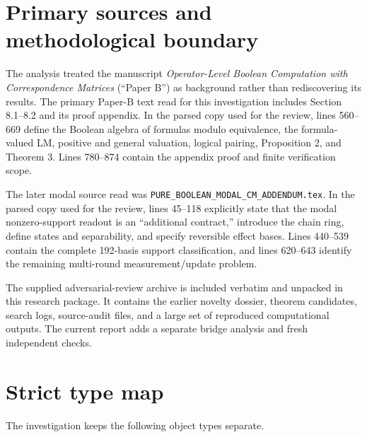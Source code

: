 \documentclass[11pt]{article}
\theoremstyle{definition}
\begin{document}
\section{Primary sources and methodological boundary}

The analysis treated the manuscript \emph{Operator-Level Boolean Computation with Correspondence
Matrices} (``Paper B'') as background rather than rediscovering its results. The primary Paper-B text
read for this investigation includes Section 8.1--8.2 and its proof appendix. In the parsed copy used
for the review, lines 560--669 define the Boolean algebra of formulas modulo equivalence, the
formula-valued LM, positive and general valuation, logical pairing, Proposition 2, and Theorem 3.
Lines 780--874 contain the appendix proof and finite verification scope.

The later modal source read was \texttt{PURE\_BOOLEAN\_MODAL\_CM\_ADDENDUM.tex}. In the
parsed copy used for the review, lines 45--118 explicitly state that the modal nonzero-support
readout is an ``additional contract,'' introduce the chain ring, define states and separability, and
specify reversible effect bases. Lines 440--539 contain the complete 192-basis support classification,
and lines 620--643 identify the remaining multi-round measurement/update problem.

The supplied adversarial-review archive is included verbatim and unpacked in this research package.
It contains the earlier novelty dossier, theorem candidates, search logs, source-audit files, and a large
set of reproduced computational outputs. The current report adds a separate bridge analysis and
fresh independent checks.

\section{Strict type map}

The investigation keeps the following object types separate.
\end{document}
